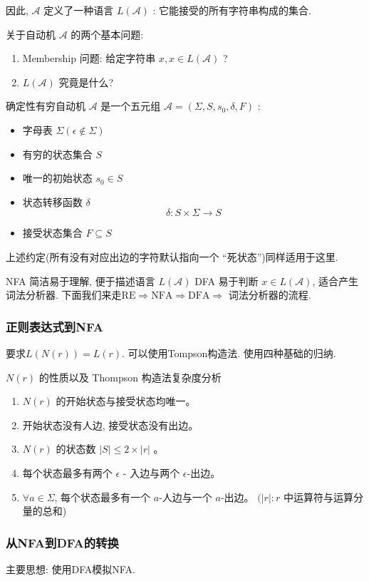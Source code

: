 \documentclass{ctexart}
\begin{document}
    因此, $\mathcal{A}$ 定义了一种语言 $L(\mathcal{A})$ : 它能接受的所有字符串构成的集合.

    关于自动机 $\mathcal{A}$ 的两个基本问题:
    \begin{enumerate}
        \item Membership 问题: 给定字符串 $x, x \in L(\mathcal{A})$ ?
        \item $L(\mathcal{A})$ 究竟是什么?
    \end{enumerate}

    \begin{definition}[DFA]
        确定性有穷自动机 $\mathcal{A}$ 是一个五元组 $\mathcal{A}=\left(\Sigma, S, s_0, \delta, F\right)$ :
        \begin{itemize}
            \item 字母表 $\Sigma(\epsilon \notin \Sigma)$
            \item 有穷的状态集合 $S$
            \item 唯一的初始状态 $s_0 \in S$
            \item 状态转移函数 $\delta$ 
            $$
            \delta: S \times \Sigma \rightarrow S
            $$
            \item 接受状态集合 $F \subseteq S$
        \end{itemize} 
        
    \end{definition}

    上述约定(所有没有对应出边的字符默认指向一个 “死状态”)同样适用于这里. 

    NFA 简洁易于理解, 便于描述语言 $L(\mathcal{A})$ DFA 易于判断 $x \in L(\mathcal{A})$, 适合产生词法分析器. 下面我们来走$\mathrm{RE} \Longrightarrow \mathrm{NFA} \Longrightarrow \mathrm{DFA} \Longrightarrow$ 词法分析器的流程. 

    \subsubsection{正则表达式到NFA}

    要求$L(N(r))=L(r)$. 可以使用Tompson构造法. 使用四种基础的归纳. 

        
    $N(r)$ 的性质以及 Thompson 构造法复杂度分析
\begin{enumerate}
    \item  $N(r)$ 的开始状态与接受状态均唯一。
    \item  开始状态没有人边, 接受状态没有出边。
    \item  $N(r)$ 的状态数 $|S| \leq 2 \times|r|$ 。
    \item  每个状态最多有两个 $\epsilon$ - 入边与两个 $\epsilon$-出边。
    \item  $\forall a \in \Sigma$, 每个状态最多有一个 $a$-人边与一个 $a$-出边。
    $(|r|: r$ 中运算符与运算分量的总和)
\end{enumerate}

\subsubsection{从NFA到DFA的转换} 主要思想: 使用DFA模拟NFA. 
\end{document}
